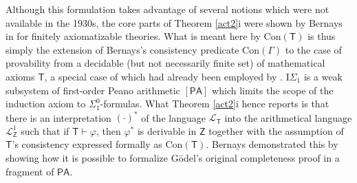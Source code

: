 \documentclass[11pt,fleqn,leqno]{article}
\def\phi{\varphi}
\def\proves{\vdash}
\begin{document}
Although this formulation takes advantage of several notions which were not available in the 1930s,  the core parts of Theorem \ref{act2}i were shown by Bernays in \citeyearpar{Hilbert1939} for finitely axiomatizable theories.  What is meant here by $\mathrm{Con}(\mathsf{T})$ is thus simply the extension of Bernays's consistency predicate $\mathrm{Con}(\Gamma)$ to the case of provability from a decidable (but not necessarily finite set) of mathematical axioms $\mathsf{T}$, a special case of which had already been employed by \citet{Godel1931a}.    $\mathrm{I}\Sigma_1$ is a weak subsystem of first-order Peano arithmetic $[\mathsf{PA}]$ which limits the scope of the induction axiom to $\Sigma^0_1$-formulas.   What Theorem \ref{act2}i hence reports is that there is an interpretation $(\cdot)^*$ of the language $\mathcal{L}_{\mathsf{T}}$ into the arithmetical language $\mathcal{L}^1_{\mathsf{Z}}$ such that if $\mathsf{T} \proves \phi$, then $\phi^*$ is derivable in $\mathsf{Z}$ together with the assumption of $\mathsf{T}$'s consistency expressed formally as $\mathrm{Con}(\mathsf{T})$.   Bernays demonstrated this by showing how it is possible to formalize G\"odel's original completeness proof in a fragment of $\mathsf{PA}$.   
\end{document}
